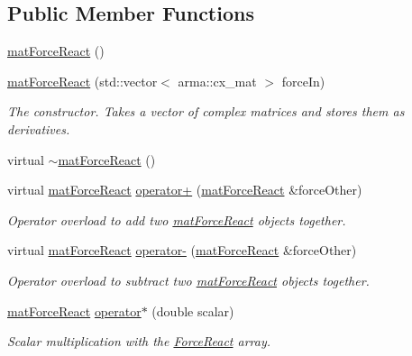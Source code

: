 \subsection*{Public Member Functions}
\begin{DoxyCompactItemize}
\item 
\hyperlink{classosea_1_1ofreq_1_1mat_force_react_a7ab246a401282eb86db5db5036eedc48}{mat\-Force\-React} ()
\item 
\hyperlink{classosea_1_1ofreq_1_1mat_force_react_a2587d123951b9f092bef18b694a59673}{mat\-Force\-React} (std\-::vector$<$ arma\-::cx\-\_\-mat $>$ force\-In)
\begin{DoxyCompactList}\small\item\em The constructor. Takes a vector of complex matrices and stores them as derivatives. \end{DoxyCompactList}\item 
virtual \hyperlink{classosea_1_1ofreq_1_1mat_force_react_a4c70511a7f49650d56b0a2ed42bf4f8b}{$\sim$mat\-Force\-React} ()
\item 
virtual \hyperlink{classosea_1_1ofreq_1_1mat_force_react}{mat\-Force\-React} \hyperlink{classosea_1_1ofreq_1_1mat_force_react_a8f65b2f67fd6169167cc9735370c99eb}{operator+} (\hyperlink{classosea_1_1ofreq_1_1mat_force_react}{mat\-Force\-React} \&force\-Other)
\begin{DoxyCompactList}\small\item\em Operator overload to add two \hyperlink{classosea_1_1ofreq_1_1mat_force_react}{mat\-Force\-React} objects together. \end{DoxyCompactList}\item 
virtual \hyperlink{classosea_1_1ofreq_1_1mat_force_react}{mat\-Force\-React} \hyperlink{classosea_1_1ofreq_1_1mat_force_react_ad3be4d341c5fdabf28634cf102a8fbc9}{operator-\/} (\hyperlink{classosea_1_1ofreq_1_1mat_force_react}{mat\-Force\-React} \&force\-Other)
\begin{DoxyCompactList}\small\item\em Operator overload to subtract two \hyperlink{classosea_1_1ofreq_1_1mat_force_react}{mat\-Force\-React} objects together. \end{DoxyCompactList}\item 
\hyperlink{classosea_1_1ofreq_1_1mat_force_react}{mat\-Force\-React} \hyperlink{classosea_1_1ofreq_1_1mat_force_react_a0bc31430954cf8b9cdee142c4d43f322}{operator$\ast$} (double scalar)
\begin{DoxyCompactList}\small\item\em Scalar multiplication with the \hyperlink{classosea_1_1ofreq_1_1_force_react}{Force\-React} array. \end{DoxyCompactList}\item 

\end{DoxyCompactItemize}
